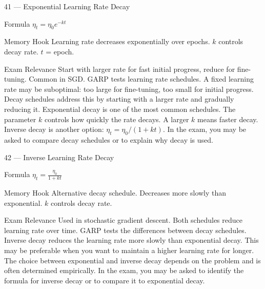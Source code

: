 \documentclass[aspectratio=169,8pt]{beamer}
\begin{document}
	\begin{frame}{41 --- Exponential Learning Rate Decay}
		\begin{block}{Formula}
			$\eta_t = \eta_0 e^{-kt}$
		\end{block}
		\begin{block}{Memory Hook}
			Learning rate decreases exponentially over epochs. $k$ controls decay rate. $t$ = epoch.
		\end{block}
		\begin{block}{Exam Relevance}
			Start with larger rate for fast initial progress, reduce for fine-tuning. Common in SGD. GARP tests learning rate schedules. A fixed learning rate may be suboptimal: too large for fine-tuning, too small for initial progress. Decay schedules address this by starting with a larger rate and gradually reducing it. Exponential decay is one of the most common schedules. The parameter $k$ controls how quickly the rate decays. A larger $k$ means faster decay. Inverse decay is another option: $\eta_t = \eta_0 / (1 + kt)$. In the exam, you may be asked to compare decay schedules or to explain why decay is used.
		\end{block}
	\end{frame}
	
	\begin{frame}{42 --- Inverse Learning Rate Decay}
		\begin{block}{Formula}
			$\eta_t = \frac{\eta_0}{1 + kt}$
		\end{block}
		\begin{block}{Memory Hook}
			Alternative decay schedule. Decreases more slowly than exponential. $k$ controls decay rate.
		\end{block}
		\begin{block}{Exam Relevance}
			Used in stochastic gradient descent. Both schedules reduce learning rate over time. GARP tests the differences between decay schedules. Inverse decay reduces the learning rate more slowly than exponential decay. This may be preferable when you want to maintain a higher learning rate for longer. The choice between exponential and inverse decay depends on the problem and is often determined empirically. In the exam, you may be asked to identify the formula for inverse decay or to compare it to exponential decay.
		\end{block}
	\end{frame}
	
\end{document}
